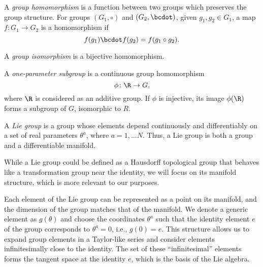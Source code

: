 \begin{definition}\label{def:group-homomorphism}
    A \emph{group homomorphism} is a function between two groups which preserves the group structure. For groups $(G_1, \circ)$ and $(G_2, \bcdot)$, given $g_1, g_2 \in G_1$, a map $f\colon G_1 \to G_2$ is a homomorphism if
    \begin{equation}
        f(g_1) \bcdot f(g_2) = f(g_1 \circ g_2).
    \end{equation}

    A \emph{group isomorphism} is a bijective homomorphism.
\end{definition}

\begin{definition}\label{def:one-parameter}
    A \emph{one-parameter subgroup} is a continuous group homomorphism
    \begin{equation}
        \phi\colon \R \to G ,
    \end{equation}
    where $\R$ is considered as an additive group. If $\phi$ is injective, its image $\phi(\R)$ forms a subgroup of $G$, isomorphic to $R$.
\end{definition}

\begin{definition}
    A \emph{Lie group} is a group whose elements depend continuously and differentiably on a set of real parameters $\theta^a$, where  $a = 1, \dots N$. Thus, a Lie group is both a group and a differentiable manifold.
\end{definition}

\begin{remark}
    While a Lie group could be defined as a Hausdorff topological group that behaves
    like a transformation group near the identity, we will focus on its manifold structure, which
    is more relevant to our purposes.
\end{remark}

Each element of the Lie group can be represented as a point on its manifold, and the dimension of the group matches that of the manifold. We denote a generic element as $g(\theta)$ and choose the coordinates $\theta^a$ such that the identity element $e$ of the group corresponds to $\theta^a = 0$, i.e., $g(0) = e$. This structure allows us to expand group elements in a Taylor-like series and consider elements infinitesimally close to the identity. The set of these “infinitesimal” elements forms the tangent space at the identity $e$, which is the basis of the Lie algebra. 


